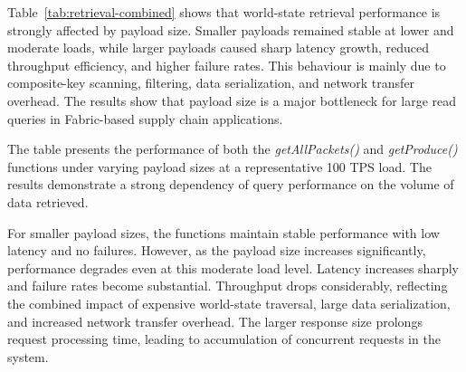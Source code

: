 \documentclass[manuscript,screen,nofonts]{acmart}
\begin{document}
\begin{table}[h]
	\centering
	\caption{Performance Results for \texttt{getPacketLifecycle} (Payload: 2908 bytes) under Varying Load}
	\label{tab:getpacketlifecycle-loadtest}
\end{table}

Table~\ref{tab:retrieval-combined} shows that world-state retrieval performance is strongly affected by payload size. Smaller payloads remained stable at lower and moderate loads, while larger payloads caused sharp latency growth, reduced throughput efficiency, and higher failure rates. This behaviour is mainly due to composite-key scanning, filtering, data serialization, and network transfer overhead. The results show that payload size is a major bottleneck for large read queries in Fabric-based supply chain applications.

The table presents the performance of both the \textit{getAllPackets()} and \textit{getProduce()} functions under varying payload sizes at a representative 100 TPS load. The results demonstrate a strong dependency of query performance on the volume of data retrieved.

For smaller payload sizes, the functions maintain stable performance with low latency and no failures. However, as the payload size increases significantly, performance degrades even at this moderate load level. Latency increases sharply and failure rates become substantial. Throughput drops considerably, reflecting the combined impact of expensive world-state traversal, large data serialization, and increased network transfer overhead. The larger response size prolongs request processing time, leading to accumulation of concurrent requests in the system.
\end{document}
